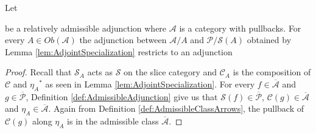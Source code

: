 \begin{lemma}
\label{lem:RestrictionInducedAdjunction}
    Let 
    be a relatively admissible adjunction where $\mathcal{A}$ is a category with pullbacks. For every $A\in Ob(\mathcal{A})$ the adjunction between $\mathcal{A}/A$ and $\mathcal{P}/\mathcal{S}(A)$ obtained by Lemma \ref{lem:AdjointSpecialization} restricts to an adjunction
    \begin{center}
    \end{center}
    \begin{proof}
        Recall that $\mathcal{S}_A$ acts as $\mathcal{S}$ on the slice category and $\mathcal{C}_A$ is the composition of $\mathcal{C}$ and ${\eta_A}^*$ as seen in Lemma \ref{lem:AdjointSpecialization}. For every $f\in\overline{\mathcal{A}}$ and $g\in\overline{\mathcal{P}}$, Definition \ref{def:AdmissibleAdjunction} give us that $\mathcal{S}(f)\in\overline{\mathcal{P}}$, $\mathcal{C}(g)\in\overline{\mathcal{A}}$ and $\eta_A\in\overline{\mathcal{A}}$. Again from Definition \ref{def:AdmissibleClassArrows}, the pullback of $\mathcal{C}(g)$ along $\eta_A$ is in the admissible class $\overline{\mathcal{A}}$.
    \end{proof}
\end{lemma}

